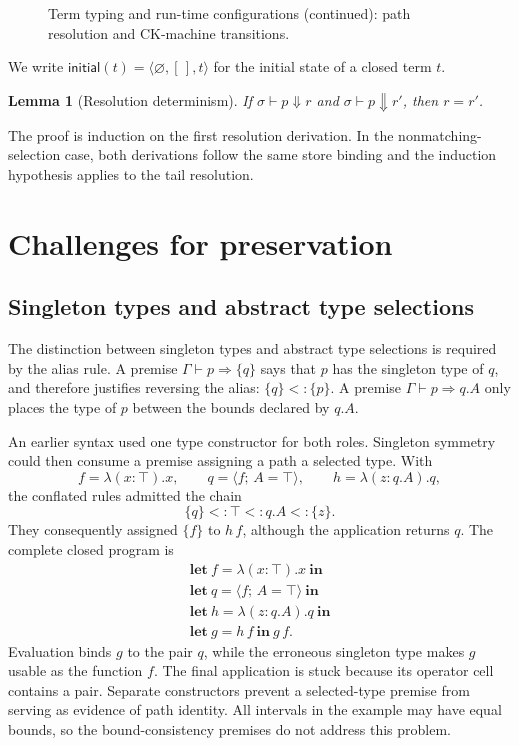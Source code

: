 \documentclass[acmsmall,screen,nonacm]{acmart}
\newtheorem{lemma}[theorem]{Lemma}
\newcommand{\sing}[1]{\{#1\}}
\newcommand{\pairval}[3]{\langle #1;\,#2=#3\rangle}
\newcommand{\resolve}{\Downarrow}
\begin{document}
\begin{figure}[H]
\caption{Term typing and run-time configurations (continued):
path resolution and CK-machine transitions.}
\label{fig:path-resolution}
\label{fig:machine}
\end{figure}

\endgroup
\clearpage

We write \(\mathsf{initial}(t)=\langle\varnothing,[\,],t\rangle\) for the
initial state of a closed term \(t\).

\begin{lemma}[Resolution determinism]
\label{lem:resolution-determinism}
If \(\sigma\vdash p\resolve r\) and
\(\sigma\vdash p\resolve r'\), then \(r=r'\).
\end{lemma}

The proof is induction on the first resolution derivation. In the
nonmatching-selection case, both derivations follow the same store binding
and the induction hypothesis applies to the tail resolution.

\section{Challenges for preservation}
\label{sec:obligations}

\subsection{Singleton types and abstract type selections}

The distinction between singleton types and abstract type selections is required
by the alias rule. A premise \(\Gamma\vdash p\Rightarrow\sing{q}\) says that \(p\)
has the singleton type of \(q\), and therefore justifies reversing the alias:
\(\sing{q}<:\sing{p}\). A premise \(\Gamma\vdash p\Rightarrow q.A\) only places the
type of \(p\) between the bounds declared by \(q.A\).

An earlier syntax used one type constructor for both roles. Singleton
symmetry could then consume a premise assigning a path a selected type. With
\[
  f=\lambda(x:\top).x,
  \qquad q=\pairval{f}{A}{\top},
  \qquad h=\lambda(z:q.A).q,
\]
the conflated rules admitted the chain
\[
  \sing{q}<:\top<:q.A<:\sing{z}.
\]
They consequently assigned \(\sing{f}\) to \(h\,f\), although the
application returns \(q\). The complete closed program is
\[
\begin{array}{l}
\mathbf{let}\ f=\lambda(x:\top).x\ \mathbf{in}\\
\mathbf{let}\ q=\pairval{f}{A}{\top}\ \mathbf{in}\\
\mathbf{let}\ h=\lambda(z:q.A).q\ \mathbf{in}\\
\mathbf{let}\ g=h\,f\ \mathbf{in}\ g\,f.
\end{array}
\]
Evaluation binds \(g\) to the pair \(q\), while the erroneous singleton
type makes \(g\) usable as the function \(f\). The final application is
stuck because its operator cell contains a pair. Separate constructors
prevent a selected-type premise from serving as evidence of path identity. All intervals
in the example may have equal bounds, so the bound-consistency premises do
not address this problem.
\end{document}
